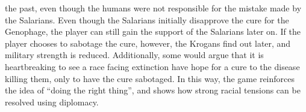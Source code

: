 \documentclass[journal]{IEEEtran}
\begin{document}
the past, even though the humans were not responsible for the mistake
made by the Salarians.
Even though the Salarians initially disapprove the cure for the Genophage,
the player can still gain the support of the Salarians later on. If the player chooses to sabotage the cure, however, the Krogans find out later, and military strength is reduced. Additionally, some would argue that it is heartbreaking to see a race facing extinction have hope for a cure to the disease killing them, only to have the cure sabotaged. In this way, the game reinforces the idea of ``doing the right thing'', and shows how strong racial tensions can be resolved using diplomacy.




%
\end{document}

